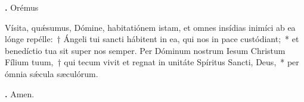 \textbf{\Vbar.} Orémus

Vísita, qu\'{\ae}sumus, Dómine, habitatiónem istam, et omnes insídias inimíci ab ea lónge repélle:~†  Ángeli tui sancti hábitent in ea, qui nos in pace custódiant;~* et benedíctio tua sit super nos semper.
Per Dóminum nostrum Iesum Christum Fílium tuum,~† qui tecum vivit et regnat in unitáte Spíritus Sancti, Deus,~* per ómnia s\'{\ae}cula sæculórum.

\textbf{\Rbar.} Amen.

